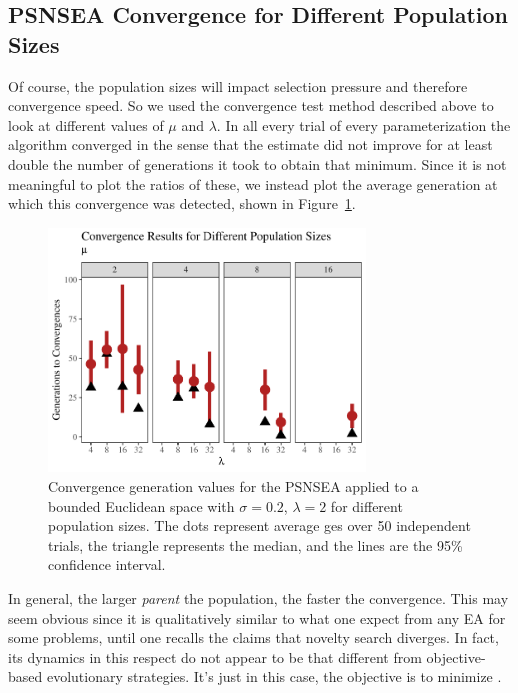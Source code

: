 \documentclass[twoside]{article}
\begin{document}
\subsection{PSNSEA Convergence for Different Population Sizes}
\label{subsec:psnsea:diffpop}

Of course, the population sizes will impact selection pressure and therefore convergence speed.  So we used the convergence test method described above to look at different values of $\mu$ and $\lambda$.  In all every trial of every parameterization the algorithm converged in the sense that the  estimate did not improve for at least double the number of generations it took to obtain that minimum.  Since it is not meaningful to plot the ratios of these, we instead plot the average generation at which this convergence was detected, shown in Figure~\ref{fig:bounded:pop:conv}.  
%
\begin{figure}[th]
  \center\includegraphics[width=0.75\textwidth]{Figures/bounded-conv-s02-r02.pdf}
  \caption{\label{fig:bounded:pop:conv} Convergence generation values for the PSNSEA applied to a bounded Euclidean space with $\sigma=0.2$, $\lambda=2$ for different population sizes.  The dots represent average ges over 50 independent trials, the triangle represents the median, and the lines are the 95\% confidence interval.}
\end{figure}

In general, the larger \emph{parent} the population, the faster the convergence.  This may seem obvious since it is qualitatively similar to what one expect from any EA for some problems, until one recalls the claims that novelty search diverges.  In fact, its dynamics in this respect do not appear to be that different from objective-based evolutionary strategies.  It's just in this case, the objective is to minimize .
\end{document}

